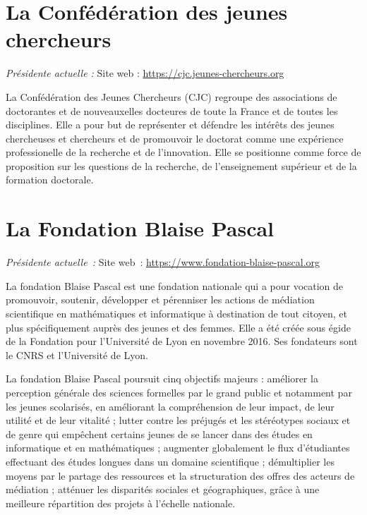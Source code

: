 \section{La Conf\'ed\'eration des jeunes chercheurs}
\emph{Pr\'esident\mp e actuel\mp le : } \hfill Site web : \url{https://cjc.jeunes-chercheurs.org}

\smallskip


La Conf\'ed\'eration des Jeunes Chercheurs (CJC) regroupe des associations
de doctorant\mp e\mp s et de nouveaux\mp elles docteur\mp e\mp s de toute la France et de toutes
les disciplines. Elle a pour but de repr\'esenter et d\'efendre les int\'er\^ets
des jeunes chercheuses et chercheurs et de promouvoir le doctorat comme une exp\'erience
professionelle de la recherche et de l'innovation. Elle se positionne
comme force de proposition sur les questions de la recherche, de
l'enseignement sup\'erieur et de la formation doctorale.


\section{La Fondation Blaise Pascal}

\emph{Pr\'esident\mp e actuel\mp le~: } \hfill Site web~: \url{https://www.fondation-blaise-pascal.org}
\smallskip

La fondation Blaise Pascal est une fondation nationale qui a pour vocation de promouvoir, soutenir, d\'evelopper et p\'erenniser les actions de m\'ediation scientifique en math\'ematiques et informatique \`a destination de tout citoyen, et plus sp\'ecifiquement aupr\`es des jeunes et des femmes. Elle a \'et\'e cr\'e\'ee sous \'egide de la Fondation pour l’Universit\'e de Lyon en novembre 2016. Ses fondateurs sont le CNRS et l’Universit\'e de Lyon.
 
La fondation Blaise Pascal poursuit cinq objectifs majeurs :
am\'eliorer la perception g\'en\'erale des sciences formelles par le grand public et notamment par les jeunes scolaris\'es, en am\'eliorant la compr\'ehension de leur impact, de leur utilit\'e et de leur vitalit\'e ; lutter contre les pr\'ejug\'es et les st\'er\'eotypes sociaux et de genre qui empêchent certains jeunes de se lancer dans des \'etudes en informatique et en math\'ematiques ; augmenter globalement le flux d'\'etudiant\mp e\mp s effectuant des \'etudes longues dans un domaine scientifique ;
d\'emultiplier les moyens par le partage des ressources et la structuration des offres des acteurs de m\'ediation ; att\'enuer les disparit\'es sociales et g\'eographiques, grâce \`a une meilleure r\'epartition des projets \`a l'\'echelle nationale.


